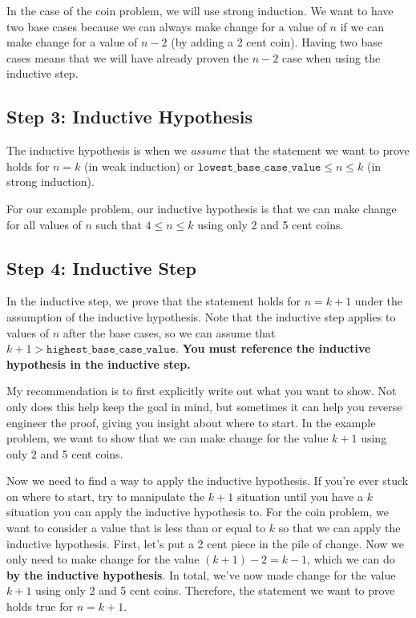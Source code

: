 \documentclass{article}
\theoremstyle{definition}
\begin{document}
In the case of the coin problem, we will use strong induction. We want to have two base cases because we can always make change for a value of $n$ if we can make change for a value of $n-2$ (by adding a 2 cent coin). Having two base cases means that we will have already proven the $n-2$ case when using the inductive step.

\subsection*{Step 3: Inductive Hypothesis}
The inductive hypothesis is when we \textit{assume} that the statement we want to prove holds for $n=k$ (in weak induction) or $\texttt{lowest\_base\_case\_value} \leq n \leq k$ (in strong induction).

For our example problem, our inductive hypothesis is that we can make change for all values of $n$ such that $4 \leq n \leq k$ using only 2 and 5 cent coins.

\subsection*{Step 4: Inductive Step}
In the inductive step, we prove that the statement holds for $n=k+1$ under the assumption of the inductive hypothesis. Note that the inductive step applies to values of $n$ after the base cases, so we can assume that $k+1 > \texttt{highest\_base\_case\_value}$. \textbf{You must reference the inductive hypothesis in the inductive step.}

My recommendation is to first explicitly write out what you want to show. Not only does this help keep the goal in mind, but sometimes it can help you reverse engineer the proof, giving you insight about where to start. In the example problem, we want to show that we can make change for the value $k+1$ using only 2 and 5 cent coins.

Now we need to find a way to apply the inductive hypothesis. If you're ever stuck on where to start, try to manipulate the $k+1$ situation until you have a $k$ situation you can apply the inductive hypothesis to. For the coin problem, we want to consider a value that is less than or equal to $k$ so that we can apply the inductive hypothesis. First, let's put a 2 cent piece in the pile of change. Now  we only need to make change for the value $(k+1)-2=k-1$, which we can do \textbf{by the inductive hypothesis}. In total, we've now made change for the value $k+1$ using only 2 and 5 cent coins. Therefore, the statement we want to prove holds true for $n=k+1$.
\end{document}
